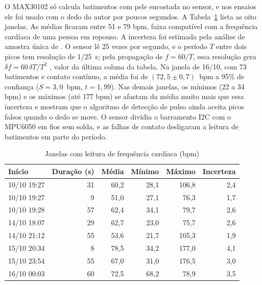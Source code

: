 O MAX30102 só calcula batimentos com pele encostada no sensor, e nos ensaios ele foi usado com o dedo do autor por poucos segundos. %
A Tabela~\ref{tab:bpm} lista as oito janelas. As médias ficaram entre 51 e 79 bpm, faixa compatível com a frequência cardíaca de uma pessoa em repouso. A incerteza foi estimada pela análise de amostra única de . O sensor lê 25 vezes por segundo, e o período $T$ entre dois picos tem resolução de 1/25~s; pela propagação de $f = 60/T$, essa resolução gera $\delta f = 60\,\delta T/T^2$ \cite{poiate}, valor da última coluna da tabela. Na janela de 16/10, com 73 batimentos e contato contínuo, a média foi de $(72{,}5 \pm 0{,}7)$~bpm a 95\% de confiança ($S = 3{,}0$~bpm, $t = 1{,}99$). %
Nas demais janelas, os mínimos (22 a 34 bpm) e os máximos (até 177 bpm) se afastam da média muito mais que essa incerteza e mostram que o algoritmo de detecção de pulso ainda aceita picos falsos quando o dedo se move. O sensor dividia o barramento I2C com o MPU6050 em fios sem solda, e as falhas de contato desligaram a leitura de batimentos em parte do período.

\begin{table}[htb]
  \centering
  \caption{Janelas com leitura de frequência cardíaca (bpm)}
  \label{tab:bpm}
  \begin{tabular}{lrrrrr}
    \hline
    \textbf{Início} & \textbf{Duração (s)} & \textbf{Média} & \textbf{Mínimo} & \textbf{Máximo} & \textbf{Incerteza} \\
    \hline
    10/10 19:27 & 31 & 60,2 & 28,1 & 106,8 & 2,4 \\
    10/10 19:27 & 9 & 51,0 & 27,1 & 76,3 & 1,7 \\
    10/10 19:28 & 57 & 62,4 & 34,1 & 79,7 & 2,6 \\
    14/10 18:07 & 29 & 62,7 & 23,0 & 75,7 & 2,6 \\
    14/10 21:12 & 55 & 53,6 & 21,7 & 105,3 & 1,9 \\
    15/10 20:34 & 8 & 78,5 & 34,2 & 177,0 & 4,1 \\
    15/10 23:54 & 55 & 67,0 & 31,0 & 176,5 & 3,0 \\
    16/10 00:03 & 60 & 72,5 & 68,2 & 78,9 & 3,5 \\ %
    \hline
  \end{tabular}
\end{table}

